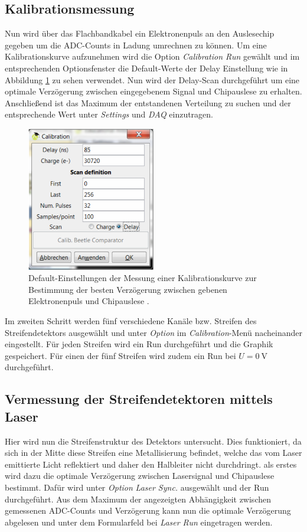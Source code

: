 \subsection{Kalibrationsmessung}
\label{sec:Kalibrationsmessung}
Nun wird über das Flachbandkabel ein Elektronenpuls an den Auslesechip gegeben
um die ADC-Counts in Ladung umrechnen zu können. Um eine Kalibrationskurve
aufzunehmen wird die Option \textit{Calibration Run} gewählt und im entsprechenden
Optionsfenster die Default-Werte der Delay Einstellung wie in Abbildung
\ref{fig:calibration-durchfuehrung} zu sehen verwendet. Nun wird der Delay-Scan durchgeführt
um eine optimale Verzögerung zwischen eingegebenem Signal und Chipauslese zu
erhalten. Anschließend ist das Maximum der entstandenen Verteilung zu suchen und
der entsprechende Wert unter \textit{Settings} und \textit{DAQ} einzutragen.
\begin{figure}[htb]
  \centering
  \includegraphics[width=0.5\textwidth]{images/Calibration.png}
  \caption{Default-Einstellungen der Messung einer Kalibrationskurve zur Bestimmung der besten Verzögerung zwischen gebenen Elektronenpuls und Chipauslese \cite{anleitung}.}
  \label{fig:calibration-durchfuehrung}
\end{figure}

Im zweiten Schritt werden fünf verschiedene Kanäle bzw. Streifen des Streifendetektors
ausgewählt und unter \textit{Option} im \textit{Calibration}-Menü nacheinander
eingestellt. Für jeden Streifen wird ein Run durchgeführt und die Graphik gespeichert.
Für einen der fünf Streifen wird zudem ein Run bei $U=\SI{0}{\volt}$ durchgeführt.


\subsection{Vermessung der Streifendetektoren mittels Laser}
\label{sec:Vermessung_Laser}
Hier wird nun die Streifenstruktur des Detektors untersucht. Dies funktioniert,
da sich in der Mitte diese Streifen eine Metallisierung befindet, welche das vom
Laser emittierte Licht reflektiert und daher den Halbleiter nicht durchdringt.
als erstes wird dazu die optimale Verzögerung zwischen Lasersignal und Chipauslese
bestimmt. Dafür wird unter \textit{Option} \textit{Laser Sync.} ausgewählt und
der Run durchgeführt. Aus dem Maximum der angezeigten Abhängigkeit zwischen
gemessenen ADC-Counts und Verzögerung kann nun die optimale Verzögerung abgelesen
und unter dem Formularfeld bei \textit{Laser Run} eingetragen werden.

